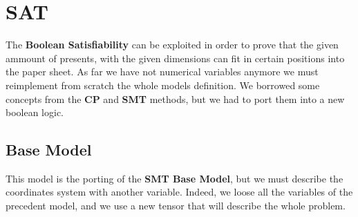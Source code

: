 \chapter{SAT}
The \textbf{Boolean Satisfiability} can be exploited in order to prove that the given ammount of presents, with the given dimensions can
fit in certain positions into the paper sheet. As far we have not numerical variables anymore we must reimplement from scratch the whole
models definition. We borrowed some concepts from the \textbf{CP} and \textbf{SMT} methods, but we had to port them into a new boolean logic.

\section{Base Model}
This model is the porting of the \textbf{SMT Base Model}, but we must describe the coordinates system with another variable.
Indeed, we loose all the variables of the precedent model, and we use a new tensor that will describe the whole problem. 

